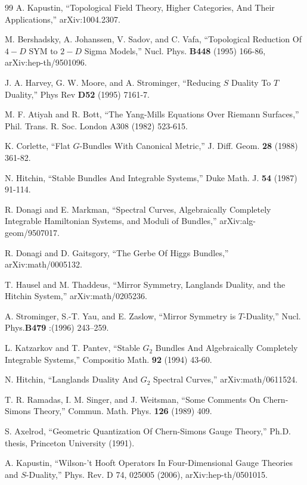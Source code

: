 \begin{thebibliography}{99}
 A. Kapustin, ``Topological Field Theory, Higher Categories, And Their Applications,''
arXiv:1004.2307.

M. Bershadsky, A. Johanssen, V. Sadov, and C. Vafa, ``Topological Reduction Of $4-D$ SYM to $2-D$ Sigma Models,''
Nucl. Phys. {\bf B448} (1995) 166-86, arXiv:hep-th/9501096.

J. A. Harvey, G. W. Moore, and A. Strominger, ``Reducing $S$ Duality To $T$ Duality,'' Phys Rev {\bf D52} (1995) 7161-7.

 M. F. Atiyah and R. Bott, “The Yang-Mills Equations Over Riemann Surfaces,” Phil. Trans.
R. Soc. London A308 (1982) 523-615.

K. Corlette, ``Flat $G$-Bundles With Canonical Metric,'' J. Diff. Geom. {\bf 28} (1988) 361-82.

N. Hitchin, ``Stable Bundles And Integrable Systems,'' Duke Math. J. {\bf 54} (1987) 91-114.

R. Donagi and E. Markman, ``Spectral Curves, Algebraically Completely Integrable Hamiltonian Systems,
and Moduli of Bundles,''  arXiv:alg-geom/9507017.

R. Donagi and D. Gaitsgory, ``The Gerbe Of Higgs Bundles,'' arXiv:math/0005132.

T. Hausel and M. Thaddeus, ``Mirror Symmetry, Langlands Duality, and the Hitchin System,''  arXiv:math/0205236.

A. Strominger, S.-T. Yau, and E. Zaslow, ``Mirror Symmetry is $T$-Duality,'' Nucl.  Phys.{\bf  B479} :(1996)  243–259.

L. Katzarkov and T. Pantev, ``Stable $G_2$ Bundles And Algebraically Completely Integrable Systems,'' Compositio Math. {\bf 92} (1994) 43-60.

N. Hitchin, ``Langlands Duality And $G_2$ Spectral Curves,'' arXiv:math/0611524.

 T. R. Ramadas, I. M. Singer, and J. Weitsman, “Some Comments On Chern-Simons
Theory,” Commun. Math. Phys. {\bf 126} (1989) 409.

S. Axelrod, ``Geometric Quantization Of Chern-Simons Gauge Theory,'' Ph.D. thesis, Princeton University (1991).

A. Kapustin, ``Wilson-'t Hooft Operators In Four-Dimensional Gauge Theories and $S$-Duality,''
Phys. Rev. D 74, 025005 (2006),
arXiv:hep-th/0501015.


\end{thebibliography}
